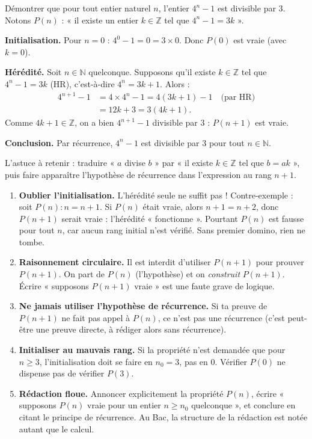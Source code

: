 \documentclass[11pt]{article}
\newcounter{popsec}
\newcounter{popsub}
\newcommand{\courssub}[1]{%
  \stepcounter{popsub}%
  \par\vspace{9pt}\noindent{\popxbold\fontsize{11.5}{13}\selectfont\color{popink}{\color{poporange}\thepopsec.\thepopsub}\hspace{6pt}#1}\par\nopagebreak\vspace{4pt}
}
\begin{document}
\begin{exoresolu}
Démontrer que pour tout entier naturel $n$, l'entier $4^n - 1$ est divisible par $3$.
\tcblower
Notons $P(n)$ : « il existe un entier $k \in \mathbb{Z}$ tel que $4^n - 1 = 3k$ ».

\textbf{Initialisation.} Pour $n = 0$ : $4^0 - 1 = 0 = 3 \times 0$. Donc $P(0)$ est vraie (avec $k = 0$).

\textbf{Hérédité.} Soit $n \in \mathbb{N}$ quelconque. Supposons qu'il existe $k \in \mathbb{Z}$ tel que $4^n - 1 = 3k$ (HR), c'est-à-dire $4^n = 3k + 1$. Alors :
\begin{align*}
4^{n+1} - 1 &= 4 \times 4^n - 1 = 4(3k + 1) - 1 \quad \text{(par HR)}\\
&= 12k + 3 = 3(4k + 1).
\end{align*}
Comme $4k + 1 \in \mathbb{Z}$, on a bien $4^{n+1} - 1$ divisible par $3$ : $P(n+1)$ est vraie.

\textbf{Conclusion.} Par récurrence, $4^n - 1$ est divisible par $3$ pour tout $n \in \mathbb{N}$.
\end{exoresolu}

L'astuce à retenir : traduire « $a$ divise $b$ » par « il existe $k \in \mathbb{Z}$ tel que $b = ak$ », puis faire apparaître l'hypothèse de récurrence dans l'expression au rang $n+1$.

\courssub{Les erreurs classiques à bannir}

\begin{attention}
\begin{enumerate}
\item \textbf{Oublier l'initialisation.} L'hérédité seule ne suffit pas ! Contre-exemple : soit $P(n) : n = n + 1$. Si $P(n)$ était vraie, alors $n + 1 = n + 2$, donc $P(n+1)$ serait vraie : l'hérédité « fonctionne ». Pourtant $P(n)$ est fausse pour tout $n$, car aucun rang initial n'est vérifié. Sans premier domino, rien ne tombe.
\item \textbf{Raisonnement circulaire.} Il est interdit d'utiliser $P(n+1)$ pour prouver $P(n+1)$. On part de $P(n)$ (l'hypothèse) et on \emph{construit} $P(n+1)$. Écrire « supposons $P(n+1)$ vraie » est une faute grave de logique.
\item \textbf{Ne jamais utiliser l'hypothèse de récurrence.} Si ta preuve de $P(n+1)$ ne fait pas appel à $P(n)$, ce n'est pas une récurrence (c'est peut-être une preuve directe, à rédiger alors sans récurrence).
\item \textbf{Initialiser au mauvais rang.} Si la propriété n'est demandée que pour $n \geq 3$, l'initialisation doit se faire en $n_0 = 3$, pas en $0$. Vérifier $P(0)$ ne dispense pas de vérifier $P(3)$.
\item \textbf{Rédaction floue.} Annoncer explicitement la propriété $P(n)$, écrire « supposons $P(n)$ vraie pour un entier $n \geq n_0$ quelconque », et conclure en citant le principe de récurrence. Au Bac, la structure de la rédaction est notée autant que le calcul.
\end{enumerate}
\end{attention}
\end{document}
